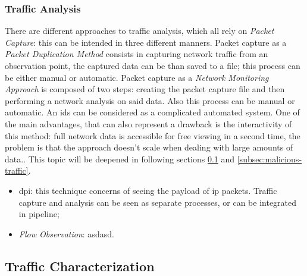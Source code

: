 \subsubsection{Traffic Analysis}
\label{subsubsec:traffic-analysis}

There are different approaches to traffic analysis, which all rely on \textit{Packet Capture}: this can be intended in three different manners. Packet capture as a \textit{Packet Duplication Method} consists in capturing network traffic from an observation point, the captured data can be than saved to a file; this process can be either manual or automatic. Packet capture as a \textit{Network Monitoring Approach} is composed of two steps: creating the packet capture file and then performing a network analysis on said data. Also this process can be manual or automatic. An \gls{ids} can be considered as a complicated automated system. One of the main advantages, that can also represent a drawback is the interactivity of this method: full network data is accessible for free viewing in a second time, the problem is that the approach doesn't scale when dealing with large amounts of data.\cite{Svoboda2015}. This topic will be deepened in following sections \ref{subsec:traffic-characterization} and \ref{subsec:malicious-traffic}.
\begin{itemize}
    \item[\faCaretRight] \gls{dpi}: this technique concerns of seeing the payload of \gls{ip} packets. Traffic capture and analysis can be seen as separate processes, or can be integrated in pipeline;
    \item[\faCaretRight] \textit{Flow Observation}: asdasd.  
\end{itemize}



\subsection{Traffic Characterization}
\label{subsec:traffic-characterization}

